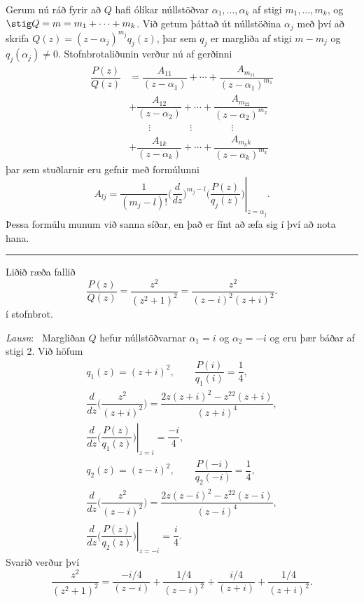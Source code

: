 Gerum nú ráð fyrir að $Q$ hafi ólíkar núllstöðvar
$\alpha_1,\dots,\alpha_k$ af stigi $m_1,\dots,m_k$,
og $\stig Q=m=m_1+\cdots+m_k$.  Við getum þáttað
út núllstöðina $\alpha_j$ með því að skrifa
$Q(z)=(z-\alpha_j)^{m_j}q_j(z)$, 
þar sem $q_j$ er margliða af stigi $m-m_j$ og $q_j(\alpha_j)\neq 0$.
Stofnbrotaliðunin verður nú af gerðinni 
\begin{align}
\dfrac{P(z)}{Q(z)}&=
\dfrac{A_{11}}{(z-\alpha_1)}+\cdots+\dfrac{A_{m_11}}{(z-\alpha_1)^{m_1}}
\label{4.4.5}\\\
&+\dfrac{A_{12}}{(z-\alpha_2)}+\cdots+\dfrac{A_{m_22}}{(z-\alpha_2)^{m_2}}\nonumber\\
&\qquad \vdots\qquad\qquad\vdots\qquad \qquad \vdots\nonumber\\
&+\dfrac{A_{1k}}{(z-\alpha_k)}+\cdots+\dfrac{A_{m_kk}}{(z-\alpha_k)^{m_k}}\nonumber
\end{align}
þar sem stuðlarnir eru gefnir með formúlunni
$$ A_{lj}=\left.\dfrac 1{(m_j-l)!}
\bigg(\dfrac {d}{dz}\bigg)^{m_j-l}\bigg(
\dfrac{P(z)}{q_j(z)}\bigg)\right|_{z=\alpha_j}.
$$
Þessa formúlu munum við sanna  síðar, en  það er fínt að æfa
sig í því að nota hana.

\bigskip\hrule\bigskip

\begin{sy}  Liðið ræða fallið
 $$\dfrac {P(z)}{Q(z)}=\dfrac{z^2}{(z^2+1)^2}=\dfrac{z^2}{(z-i)^2(z+i)^2}.
 $$
í stofnbrot.

\smallskip\noindent
{\it Lausn}: \ 
Margliðan $Q$ hefur núllstöðvarnar $\alpha_1=i$ og $\alpha_2=-i$ og eru
þær báðar af stigi 2.  Við höfum
\begin{gather*}
q_1(z)=(z+i)^2, \qquad \dfrac{P(i)}{q_1(i)}= \dfrac 14,\\
\dfrac d{dz}\bigg(\dfrac{z^2}{(z+i)^2}\bigg)= \dfrac
{2z(z+i)^2-z^22(z+i)}{(z+i)^4},\\
\left.\dfrac d{dz}\bigg(\dfrac{P(z)}{q_1(z)}\bigg)\right|_{z=i}
=\dfrac{-i}4,\\
q_2(z)=(z-i)^2, \qquad \dfrac{P(-i)}{q_2(-i)}= \dfrac 14,\\
\dfrac d{dz}\bigg(\dfrac{z^2}{(z-i)^2}\bigg)= \dfrac
{2z(z-i)^2-z^22(z-i)}{(z-i)^4},\\
\left.\dfrac d{dz}\bigg(\dfrac{P(z)}{q_2(z)}\bigg)\right|_{z=-i}
=\dfrac{i}4.
\end{gather*}
 Svarið verður því 
 $$\dfrac{z^2}{(z^2+1)^2}=
\dfrac{-i/4}{(z-i)}+\dfrac{1/4}{(z-i)^2} +
\dfrac {i/4}{(z+i)}+\dfrac{1/4}{(z+i)^2}.
 $$
\end{sy}

